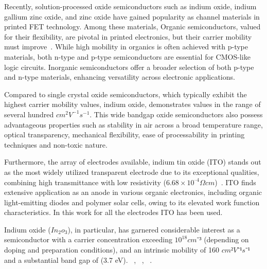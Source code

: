 Recently, solution-processed oxide semiconductors such as indium oxide, indium gallium zinc oxide, and zinc oxide have gained popularity as channel materials in printed FET technology. 
Among these materials, Organic semiconductors, valued for their flexibility, are pivotal in printed electronics, but their carrier mobility must improve~\cite{ref27}. While high mobility in organics is often achieved with p-type materials, both n-type and p-type semiconductors are essential for CMOS-like logic circuits.  Inorganic semiconductors offer a broader selection of both p-type and n-type materials, enhancing versatility across electronic applications.

Compared to single crystal oxide semiconductors, which typically exhibit the highest carrier mobility values, indium oxide, demonstrates values in the range of several hundred $cm^2 V^{-1} s^{-1}$. This wide bandgap oxide semiconductors also possess advantageous properties such as stability in air across a broad temperature range, optical transparency, mechanical flexibility, ease of processability in printing techniques and non-toxic nature.

Furthermore, the array of electrodes available, indium tin oxide (ITO) stands out as the most widely utilized transparent electrode due to its exceptional qualities, combining high transmittance with low resistivity ($6.68\times 10^{–4} Ω cm$)~\cite{ref7}. ITO finds extensive application as an anode in various organic electronics, including organic light-emitting diodes and polymer solar cells, owing to its elevated work function characteristics. In this work for all the electrodes ITO has been used. ~\cite{ref8}

Indium oxide ($In_2o_3$), in particular, has garnered considerable interest as a semiconductor with a carrier concentration exceeding $10^{18} cm{⁻³}$ (depending on doping and preparation conditions), and an intrinsic mobility of 160 $cm{²} V{⁻¹} s{⁻¹}$ and a substantial band gap of (3.7 eV). ~\cite{ref1},  ~\cite{ref2}, ~\cite{ref3}.







